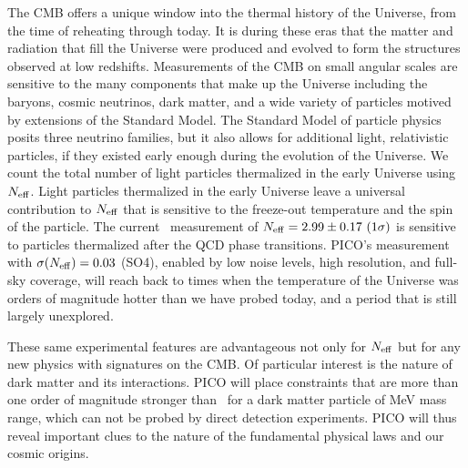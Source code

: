 \documentclass[PICOReport.tex]{subfiles}
\begin{document}
The CMB offers a unique window into the thermal history of the Universe, from the time of reheating through today.  It is during these eras that the matter and radiation that fill the Universe were produced and evolved to form the structures observed at low redshifts.  Measurements of the CMB on small angular scales are sensitive to the many components that make up the Universe including the baryons, cosmic neutrinos, dark matter, and a wide variety of particles motived by extensions of the Standard Model.  The Standard Model of particle physics posits three neutrino families, but it also allows for additional light, relativistic particles, if they existed early enough during the evolution of the Universe.   We count the total number of light particles thermalized in the early Universe using ${N_{\rm eff}}$. Light particles thermalized in the early Universe leave a universal contribution to ${N_{\rm eff}}$ that is sensitive to the freeze-out temperature and the spin of the particle.  The current \planck\ measurement of ${N_{\rm eff}} = 2.99 \pm 0.17 \,\, (1\sigma)$ is sensitive to particles thermalized after the QCD phase transitions. PICO's measurement with $\sigma({N_{\rm eff}})=0.03$ (SO4), enabled by low noise levels, high resolution, and full-sky coverage, will reach back to times when the temperature of the Universe was orders of magnitude hotter than we have probed today, and a period that is still largely unexplored.   

These same experimental features are advantageous not only for ${N_{\rm eff}}$ but for any new physics with signatures on the CMB. Of particular interest is the nature of dark matter and its interactions. PICO will place constraints that are more than one order of magnitude stronger than \planck\ for a dark matter particle of MeV mass range, which can not be probed by direct detection experiments. PICO will thus reveal important clues to the nature of the fundamental physical laws and our cosmic origins. 


\end{document}
